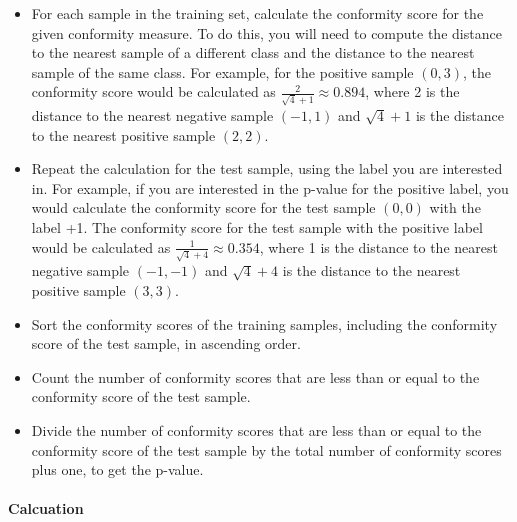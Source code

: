 \begin{itemize}
	\item For each sample in the training set, calculate the conformity score for the given conformity measure. To do this, you will need to compute the distance to the nearest sample of a different class and the distance to the nearest sample of the same class. For example, for the positive sample $(0, 3)$, the conformity score would be calculated as $\frac{2}{\sqrt{4} + 1} \approx 0.894$, where 2 is the distance to the nearest negative sample $(-1, 1)$ and $\sqrt{4} + 1$ is the distance to the nearest positive sample $(2, 2)$.
	\item Repeat the calculation for the test sample, using the label you are interested in. For example, if you are interested in the p-value for the positive label, you would calculate the conformity score for the test sample $(0, 0)$ with the label +1. The conformity score for the test sample with the positive label would be calculated as $\frac{1}{\sqrt{4} + 4} \approx 0.354$, where 1 is the distance to the nearest negative sample $(-1, -1)$ and $\sqrt{4} + 4$ is the distance to the nearest positive sample $(3, 3)$.
	\item Sort the conformity scores of the training samples, including the conformity score of the test sample, in ascending order.
	\item Count the number of conformity scores that are less than or equal to the conformity score of the test sample.
	\item Divide the number of conformity scores that are less than or equal to the conformity score of the test sample by the total number of conformity scores plus one, to get the p-value.
\end{itemize}


\paragraph{Calcuation}


